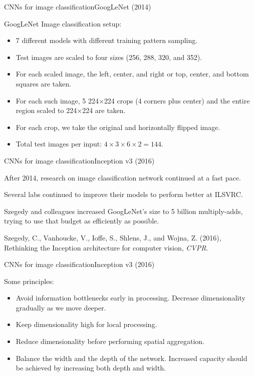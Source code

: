 \documentclass[aspectratio=169]{beamer}
\begin{document}
\begin{frame}{CNNs for image classification}{GoogLeNet (2014)}

  GoogLeNet Image classification setup:
  \begin{itemize}
  \item 7 different models with different training pattern sampling. 
  \item Test images are scaled to four sizes (256, 288, 320, and 352).
  \item For each scaled image, the left, center, and right or top,
    center, and bottom squares are taken.
  \item For each such image, 5 224$\times$224 crops (4 corners plus center)
    and the entire region scaled to 224$\times$224 are taken.
  \item For each crop, we take the original and horizontally flipped image.
  \item Total test images per input: $4\times 3\times 6\times 2 = 144$.
  \end{itemize}
  
\end{frame}


\begin{frame}{CNNs for image classification}{Inception v3 (2016)}

  After 2014, research on image classification network continued
  at a fast pace.

  \medskip

  Several labs continued to improve their models to perform better
  at ILSVRC.

  \medskip

  Szegedy and colleagues increased GoogLeNet's size to 5 billion
  multiply-adds, trying to use that budget as efficiently as possible.

  \medskip

  Szegedy, C., Vanhoucke, V., Ioffe, S., Shlens, J., and Wojna, Z. (2016),
  Rethinking the Inception architecture for computer vision, \textit{CVPR}.

\end{frame}


\begin{frame}{CNNs for image classification}{Inception v3 (2016)}

  Some principles:
  \begin{itemize}
    \item Avoid information bottlenecks early in processing. Decrease
      dimensionality gradually as we move deeper.
    \item Keep dimensionality high for local processing.
    \item Reduce dimensionality before performing spatial aggregation.
    \item Balance the width and the depth of the network. Increased
      capacity should be achieved by increasing both depth and width.
  \end{itemize}

\end{frame}
\end{document}
